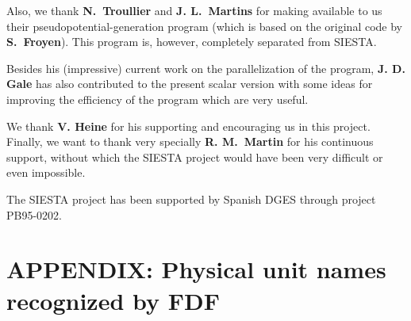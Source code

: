 Also, we thank {\bf N.\ Troullier} and {\bf J. L.\ Martins} for
making available to us their pseudopotential-generation program
(which is based on the original code by {\bf S.\ Froyen}).
This program is, however, completely separated from SIESTA.

Besides his (impressive) current work on the parallelization of the program,
{\bf J. D. Gale} has also contributed to the present scalar version
with some ideas for improving the efficiency of the program 
which are very useful.

We thank {\bf V. Heine} for his supporting and encouraging us in this
project. Finally, we want to thank very specially {\bf R. M.\ Martin} 
for his continuous support, without which the SIESTA project would have 
been very difficult or even impossible.

The SIESTA project has been supported by Spanish DGES
through project PB95-0202.


\section{APPENDIX: Physical unit names recognized by FDF}

